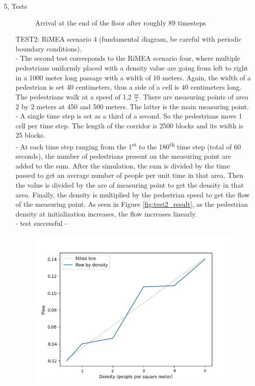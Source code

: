 \documentclass[10pt,a4paper]{article}
\begin{document}
\begin{task}{5, Tests}
\begin{enumerate}
\begin{figure}[H]
    \caption{Arrival at the end of the floor after roughly 89 timesteps}
    \label{fig:result_test1}
\end{figure}
\item[TEST2:] RiMEA scenario 4 (fundamental diagram, be careful with periodic boundary conditions).\\
- The second test corresponds to the RiMEA scenario four, where multiple pedestrians uniformly placed with a density value are going from left to right in a 1000 meter long passage with a width of 10 meters. Again, the width of a pedestrian is set 40 centimeters, thus a side of a cell is 40 centimeters long. The pedestrians walk at a speed of 1,2 $\frac{m}{s}$. There are measuring points of area 2 by 2 meters at 450 and 500 meters. The latter is the main measuring point. \\
- A single time step is set as a third of a second. So the pedestrians move 1 cell per time step. The length of the corridor is 2500 blocks and its width is 25 blocks. \\
- At each time step ranging from the 1\textsuperscript{st} to the 180\textsuperscript{th} time step (total of 60 seconds), the number of pedestrians present on the measuring point are added to the sum. After the simulation, the sum is divided by the time passed to get an average number of people per unit time in that area. Then the value is divided by the are of measuring point to get the density in that area. Finally, the density is multiplied by the pedestrian speed to get the flow of the measuring point. As seen in Figure \ref{fig:test2_result}, as the pedestrian density at initialization increases, the flow increases linearly. \\
- test successful - \\
\begin{figure}[H]
    \centering
    \includegraphics[width=\textwidth]{pictures/test2result.png}

\end{figure}
\end{enumerate}
\end{task}
\end{document}
